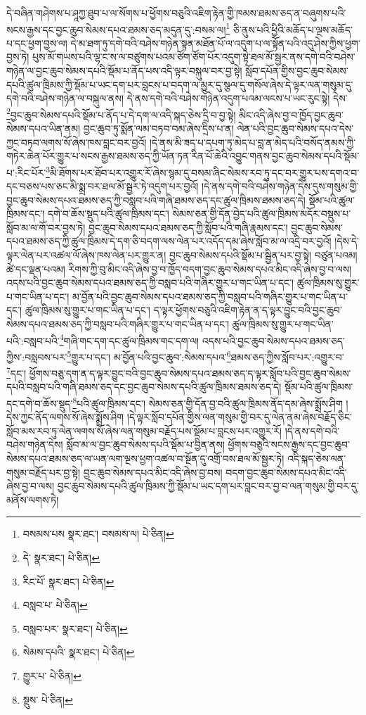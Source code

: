 དེ་བཞིན་གཤེགས་པ་ཤཱཀྱ་ཐུབ་པ་ལ་སོགས་པ་ཕྱོགས་བཅུའི་འཇིག་རྟེན་གྱི་ཁམས་ཐམས་ཅད་ན་བཞུགས་པའི་སངས་རྒྱས་དང་བྱང་ཆུབ་སེམས་དཔའ་ཐམས་ཅད་མདུན་དུ་:བསམ་ལ།\footnote{བསམས་པས  སྣར་ཐང་། བསམས་ལ།  པེ་ཅིན། } ཅི་ནུས་པའི་ཕྱིའི་མཆོད་པ་ལྔས་མཆོད་པ་དང་ཕྱག་བྱས་ལ། དེ་མ་ཐག་ཏུ་དགེ་བའི་བཤེས་གཉེན་སྟན་མཐོན་པོ་ལ་འདུག་པ་ལ་སྟོན་པའི་འདུ་ཤེས་ཀྱིས་ཕྱག་བྱས་ཏེ། པུས་མོ་གཡས་པའི་ལྷ་ང་ས་ལ་བཙུགས་པའམ་ཙོག་ཙོག་པོར་འདུག་སྟེ་ཐལ་མོ་སྦྱར་ནས་དགེ་བའི་བཤེས་གཉེན་ལ་བྱང་ཆུབ་སེམས་དཔའི་སྡོམ་པ་ནོད་པས་འདི་ལྟར་བསྐུལ་བར་བྱ་སྟེ། སློབ་དཔོན་གྱིས་བྱང་ཆུབ་སེམས་དཔའི་ཚུལ་ཁྲིམས་ཀྱི་སྡོམ་པ་ཡང་དག་པར་བླངས་པ་བདག་ལ་མྱུར་དུ་སྩལ་དུ་གསོལ་ཞེས་དེ་ལྟར་ལན་གསུམ་དུ་དགེ་བའི་བཤེས་གཉེན་ལ་བསྐུལ་ནས། དེ་ནས་དགེ་བའི་བཤེས་གཉེན་འདུག་པའམ་ལངས་པ་ཡང་རུང་སྟེ། དེས་\footnote{དེ་  སྣར་ཐང་།  པེ་ཅིན། }བྱང་ཆུབ་སེམས་དཔའི་སྡོམ་པ་ནོད་པ་དེ་དག་ལ་འདི་སྐད་ཅེས་དྲི་བ་བྱ་སྟེ། མིང་འདི་ཞེས་བྱ་བ་ཁྱོད་བྱང་ཆུབ་སེམས་དཔའ་ཡིན་ནམ། བྱང་ཆུབ་ཏུ་སྨོན་ལམ་བཏབ་བམ་ཞེས་དྲིས་པ་ན། ལེན་པའི་བྱང་ཆུབ་སེམས་དཔའ་དེས་ཀྱང་བཏབ་ལགས་སོ་ཞེས་ཁས་བླང་བར་བྱའོ། །དེ་ནས་མི་ཟད་པ་དཔག་ཏུ་མེད་པ་བླ་ན་མེད་པའི་བསོད་ནམས་ཀྱི་གཏེར་ཆེན་པོར་གྱུར་པ་སངས་རྒྱས་ཐམས་ཅད་ཀྱི་ཡོན་ཏན་རིན་པོ་ཆེའི་འབྱུང་གནས་བྱང་ཆུབ་སེམས་དཔའི་སྡོམ་པ་:རིང་པོར་\footnote{རིང་པོ་  སྣར་ཐང་།  པེ་ཅིན། }མི་ཐོགས་པར་ཐོབ་པར་འགྱུར་རོ་ཞེས་སྙམ་དུ་བསམ་ཞིང་སེམས་རབ་ཏུ་དང་བར་གྱུར་པས་དགའ་བ་དང་བཅས་པས་ཅང་མི་སྨྲ་བར་ཐལ་མོ་སྦྱར་ཏེ་འདུག་པར་བྱའོ། །དེ་ནས་དགེ་བའི་བཤེས་གཉེན་དེས་དུས་གསུམ་གྱི་བྱང་ཆུབ་སེམས་དཔའ་ཐམས་ཅད་ཀྱི་བསླབ་པའི་གཞི་ཐམས་ཅད་དང་ཚུལ་ཁྲིམས་ཐམས་ཅད་དེ། སྡོམ་པའི་ཚུལ་ཁྲིམས་དང་། དགེ་བ་ཆོས་སྡུད་པའི་ཚུལ་ཁྲིམས་དང་། སེམས་ཅན་གྱི་དོན་བྱེད་པའི་ཚུལ་ཁྲིམས་མདོར་བསྡུས་པ་སློབ་མ་ལ་གོ་བར་བྱས་ཏེ། བྱང་ཆུབ་སེམས་དཔའ་ཐམས་ཅད་ཀྱི་སློབ་པའི་གཞི་རྣམས་དང་། བྱང་ཆུབ་སེམས་དཔའ་ཐམས་ཅད་ཀྱི་ཚུལ་ཁྲིམས་དེ་དག་ཅི་བདག་ལས་ལེན་པར་འདོད་དམ་ཞེས་སློབ་མ་ལ་འདྲི་བར་བྱའོ། །དེས་དེ་ལྟར་ལེན་པར་འཚལ་ལོ་ཞེས་ཁས་ལེན་པར་གྱུར་ན། བྱང་ཆུབ་སེམས་དཔའི་སྡོམ་པ་སྦྱིན་པར་བྱ་སྟེ། བཙུན་པའམ། ཚེ་དང་ལྡན་པའམ། རིགས་ཀྱི་བུ་མིང་འདི་ཞེས་བྱ་བ་ཁྱོད་བདག་བྱང་ཆུབ་སེམས་དཔའ་མིང་འདི་ཞེས་བྱ་བ་ལས། འདས་པའི་བྱང་ཆུབ་སེམས་དཔའ་ཐམས་ཅད་ཀྱི་བསླབ་པའི་གཞིར་གྱུར་པ་གང་ཡིན་པ་དང་། ཚུལ་ཁྲིམས་སུ་གྱུར་པ་གང་ཡིན་པ་དང་། མ་བྱོན་པའི་བྱང་ཆུབ་སེམས་དཔའ་ཐམས་ཅད་ཀྱི་བསླབ་པའི་གཞིར་གྱུར་པ་གང་ཡིན་པ་དང་། ཚུལ་ཁྲིམས་སུ་གྱུར་པ་གང་ཡིན་པ་དང་། ད་ལྟར་ཕྱོགས་བཅུའི་འཇིག་རྟེན་ན་ད་ལྟར་བྱུང་བའི་བྱང་ཆུབ་སེམས་དཔའ་ཐམས་ཅད་ཀྱི་བསླབ་པའི་གཞིར་གྱུར་པ་གང་ཡིན་པ་དང་། ཚུལ་ཁྲིམས་སུ་གྱུར་པ་གང་ཡིན་པའི་:བསླབ་པའི་\footnote{བསླབ་པ་  པེ་ཅིན། }གཞི་གང་དག་དང་ཚུལ་ཁྲིམས་གང་དག་ལ། འདས་པའི་བྱང་ཆུབ་སེམས་དཔའ་ཐམས་ཅད་ཀྱིས་:བསླབས་པར་\footnote{བསླབ་པར་  སྣར་ཐང་།  པེ་ཅིན། }གྱུར་པ་དང་། མ་བྱོན་པའི་བྱང་ཆུབ་:སེམས་དཔའ་\footnote{སེམས་དཔའི་  སྣར་ཐང་།  པེ་ཅིན། }ཐམས་ཅད་ཀྱིས་སློབ་པར་:འགྱུར་བ་\footnote{གྱུར་པ་  པེ་ཅིན། }དང་། ཕྱོགས་བཅུ་དག་ན་ད་ལྟར་བྱུང་བའི་བྱང་ཆུབ་སེམས་དཔའ་ཐམས་ཅད་ད་ལྟར་སློབ་པའི་བྱང་ཆུབ་སེམས་དཔའི་བསླབ་པའི་གཞི་ཐམས་ཅད་དང་བྱང་ཆུབ་སེམས་དཔའི་ཚུལ་ཁྲིམས་ཐམས་ཅད་དེ། སྡོམ་པའི་ཚུལ་ཁྲིམས་དང་དགེ་བ་ཆོས་སྡུད་\footnote{སྡུས་  པེ་ཅིན། }པའི་ཚུལ་ཁྲིམས་དང་། སེམས་ཅན་གྱི་དོན་བྱ་བའི་ཚུལ་ཁྲིམས་ནོད་དམ་ཞེས་སྨྲོས་ཤིག །དེས་ཀྱང་ནོད་ལགས་སོ་ཞེས་སྨྲོས་ཤིག །དེ་ལྟར་སློབ་དཔོན་གྱིས་ལན་གསུམ་གྱི་བར་དུ་ལེན་ནམ་ཞེས་བརྗོད་ཅིང་སློབ་མས་རབ་ཏུ་ལེན་ལགས་སོ་ཞེས་ལན་གསུམ་བརྗོད་པས་སྡོམ་པ་བླངས་པར་འགྱུར་རོ། །དེ་ནས་དགེ་བའི་བཤེས་གཉེན་དེས། སློབ་མ་ལ་བྱང་ཆུབ་སེམས་དཔའི་སྡོམ་པ་བྱིན་ནས། ཕྱོགས་བཅུའི་སངས་རྒྱས་དང་བྱང་ཆུབ་སེམས་དཔའ་ཐམས་ཅད་ལ་ཡན་ལག་ལྔས་ཕྱག་འཚལ་བ་སྔོན་དུ་འགྲོ་བས་ཐལ་མོ་སྦྱར་ཏེ། འདི་སྐད་ཅེས་ལན་གསུམ་བརྗོད་པར་བྱ་སྟེ། བྱང་ཆུབ་སེམས་དཔའ་མིང་འདི་ཞེས་བྱ་བས། བདག་བྱང་ཆུབ་སེམས་དཔའ་མིང་འདི་ཞེས་བྱ་བ་ལས། བྱང་ཆུབ་སེམས་དཔའི་ཚུལ་ཁྲིམས་ཀྱི་སྡོམ་པ་ཡང་དག་པར་བླང་བར་བྱ་བ་ལན་གསུམ་གྱི་བར་དུ་མནོས་ལགས་ཏེ། 